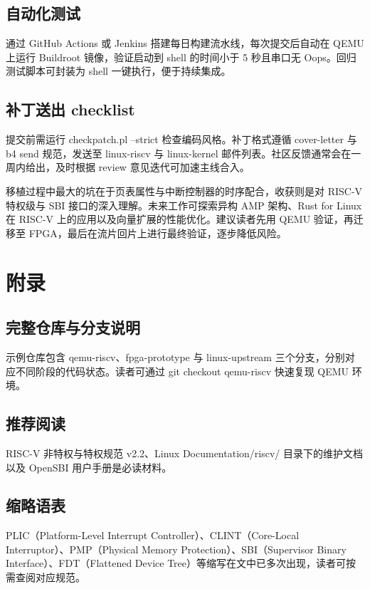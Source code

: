 \section{自动化测试}
通过 GitHub Actions 或 Jenkins 搭建每日构建流水线，每次提交后自动在 QEMU 上运行 Buildroot 镜像，验证启动到 shell 的时间小于 5 秒且串口无 Oops。回归测试脚本可封装为 shell 一键执行，便于持续集成。\par
\section{补丁送出 checklist}
提交前需运行 checkpatch.pl --strict 检查编码风格。补丁格式遵循 cover-letter 与 b4 send 规范，发送至 linux-riscv 与 linux-kernel 邮件列表。社区反馈通常会在一周内给出，及时根据 review 意见迭代可加速主线合入。\par
移植过程中最大的坑在于页表属性与中断控制器的时序配合，收获则是对 RISC-V 特权级与 SBI 接口的深入理解。未来工作可探索异构 AMP 架构、Rust for Linux 在 RISC-V 上的应用以及向量扩展的性能优化。建议读者先用 QEMU 验证，再迁移至 FPGA，最后在流片回片上进行最终验证，逐步降低风险。\par
\chapter{附录}
\section{完整仓库与分支说明}
示例仓库包含 qemu-riscv、fpga-prototype 与 linux-upstream 三个分支，分别对应不同阶段的代码状态。读者可通过 git checkout qemu-riscv 快速复现 QEMU 环境。\par
\section{推荐阅读}
RISC-V 非特权与特权规范 v2.2、Linux Documentation/riscv/ 目录下的维护文档以及 OpenSBI 用户手册是必读材料。\par
\section{缩略语表}
PLIC（Platform-Level Interrupt Controller）、CLINT（Core-Local Interruptor）、PMP（Physical Memory Protection）、SBI（Supervisor Binary Interface）、FDT（Flattened Device Tree）等缩写在文中已多次出现，读者可按需查阅对应规范。\par
